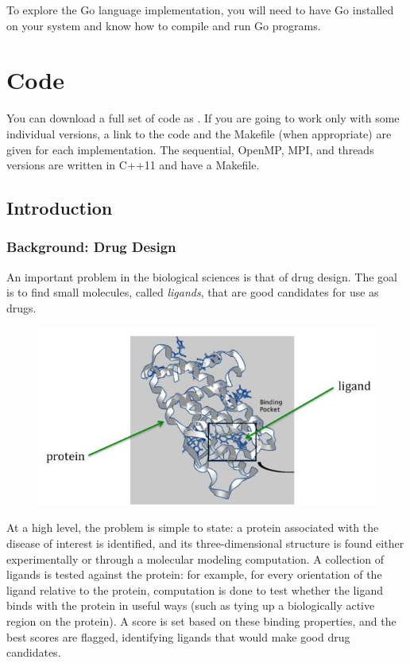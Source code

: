 \documentclass[letterpaper,10pt,openany,oneside]{sphinxmanual}
\begin{document}
To explore the Go language implementation, you will need to have Go installed on your system and know how to compile and run Go programs.


\chapter{Code}
\label{index:code}
You can download a full set of code as .
If you are going to work only with some individual versions, a link to the code and the Makefile (when appropriate) are given for each implementation. The sequential, OpenMP, MPI, and threads versions are written in C++11 and have a Makefile.


\section{Introduction}
\label{intro/intro:introduction}\label{intro/intro::doc}

\subsection{Background: Drug Design}
\label{intro/intro:background-drug-design}
An important problem in the biological sciences is that of drug design. The goal is to find small molecules, called \emph{ligands}, that are good candidates for use as drugs.
\begin{figure}[htbp]
\centering

\includegraphics{proteinligand.jpg}
\end{figure}

At a high level, the problem is simple to state: a protein associated with the disease of interest is identified, and its three-dimensional structure is found either experimentally or through a molecular modeling computation. A collection of ligands is tested against the protein: for example, for every orientation of the ligand relative to the protein, computation is done to test whether the ligand binds with the protein in useful ways (such as tying up a biologically active region on the protein). A score is set based on these binding properties, and the best scores are flagged, identifying ligands that would make good drug candidates.
\end{document}
